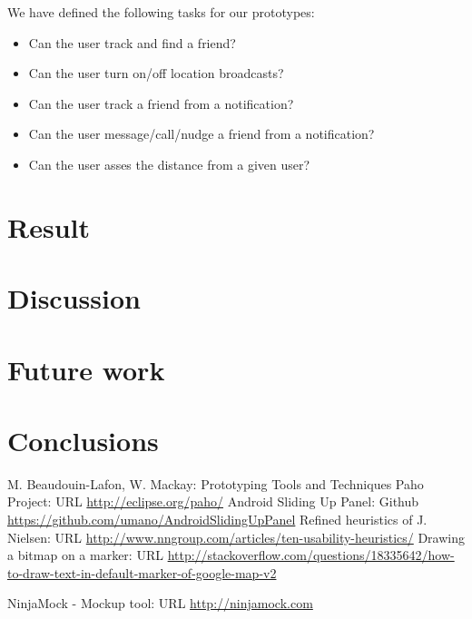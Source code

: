 \documentclass[runningheads,a4paper]{llncs}
\begin{document}
We  have defined the following tasks for our prototypes:\\
\begin{itemize}
\item Can the user track and find a friend? 
\item Can the user turn on/off location broadcasts? 
\item Can the user track a friend from a notification?
\item Can the user message/call/nudge a friend from a notification?
\item Can the user asses the distance from a given user?
\end{itemize}




\section{Result}
\section{Discussion}
\section{Future work}
\section{Conclusions}

\begin{thebibliography}{4}

 M. Beaudouin-Lafon, W. Mackay: Prototyping Tools and Techniques
 Paho Project: URL \url{http://eclipse.org/paho/}
 Android Sliding Up Panel: Github \url{https://github.com/umano/AndroidSlidingUpPanel}
Refined heuristics of J. Nielsen: URL \url{http://www.nngroup.com/articles/ten-usability-heuristics/}
 Drawing a bitmap on a marker: URL \url{http://stackoverflow.com/questions/18335642/how-to-draw-text-in-default-marker-of-google-map-v2}

 NinjaMock - Mockup tool: URL \url{http://ninjamock.com}



\end{thebibliography}
\end{document}
